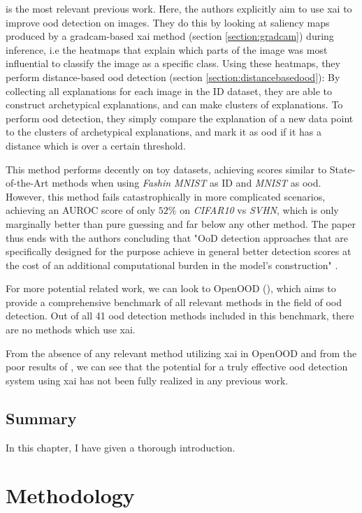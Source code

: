\documentclass[UKenglish]{uiomasterthesis} %
\theoremstyle{definition}
\begin{document}
\cite{martinez} is the most relevant previous work. Here, the authors explicitly aim to use \ac{xai} to improve \ac{ood} detection on images. They do this by looking at saliency maps produced by a \ac{gradcam}-based \ac{xai} method (section \ref{section:gradcam}) during inference, i.e the heatmaps that explain which parts of the image was most influential to classify the image as a specific class. Using these heatmaps, they perform distance-based \ac{ood} detection (section \ref{section:distancebasedood}): By collecting all explanations for each image in the ID dataset, they are able to construct archetypical explanations, and can make clusters of explanations. To perform \ac{ood} detection, they simply compare the explanation of a new data point to the clusters of archetypical explanations, and mark it as \ac{ood} if it has a distance which is over a certain threshold.

This method performs decently on toy datasets, achieving scores similar to State-of-the-Art methods when using {\it Fashin MNIST} as ID and {\it MNIST} as \ac{ood}. However, this method fails catastrophically in more complicated scenarios, achieving an AUROC score of only $52\%$ on {\it CIFAR10} vs {\it SVHN}, which is only marginally better than pure guessing and far below any other method. The paper thus ends with the authors concluding that "OoD detection approaches that are specifically designed for the purpose achieve in general better detection scores at the cost of an additional computational burden in the model’s construction" \cite{martinez}.

For more potential related work, we can look to OpenOOD (\cite{openood}), which aims to provide a comprehensive benchmark of all relevant methods in the field of \ac{ood} detection. Out of all 41 \ac{ood} detection methods included in this benchmark, there are no methods which use \ac{xai}.

From the absence of any relevant method utilizing \ac{xai} in OpenOOD and from the poor results of \cite{martinez}, we can see that the potential for a truly effective \ac{ood} detection system using \ac{xai} has not been fully realized in any previous work.

\section{Summary}

In this chapter, I have given a thorough introduction.

\chapter{Methodology} \label{chapter:methodology}
\end{document}
